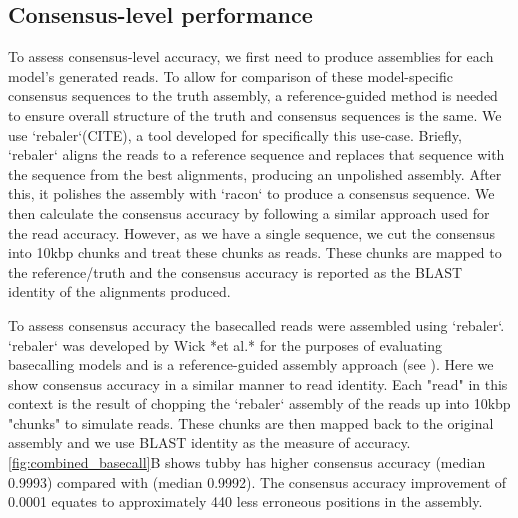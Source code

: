\subsection{Consensus-level performance}
\label{sec:tubby-error-types}

To assess consensus-level accuracy, we first need to produce assemblies for each model's generated reads. To allow for comparison of these model-specific consensus sequences to the truth assembly, a reference-guided method is needed to ensure overall structure of the truth and consensus sequences is the same. We use `rebaler`(CITE), a tool developed for specifically this use-case. Briefly, `rebaler` aligns the reads to a reference sequence and replaces that sequence with the sequence from the best alignments, producing an unpolished assembly. After this, it polishes the assembly with `racon` to produce a consensus sequence. We then calculate the consensus accuracy by following a similar approach used for the read accuracy. However, as we have a single sequence, we cut the consensus into 10kbp chunks and treat these chunks as reads. These chunks are mapped to the reference/truth and the consensus accuracy is reported as the BLAST identity of the alignments produced.  

To assess consensus accuracy the basecalled reads were assembled using `rebaler`. `rebaler` was developed by Wick *et al.* for the purposes of evaluating basecalling models and is a reference-guided assembly approach (see ). Here we show consensus accuracy in a similar manner to read identity. Each "read" in this context is the result of chopping the `rebaler` assembly of the reads up into 10kbp "chunks" to simulate reads. These chunks are then mapped back to the original assembly and we use BLAST identity as the measure of accuracy. \autoref{fig:combined_basecall}B shows tubby has higher consensus accuracy (median 0.9993) compared with \guppy{} (median 0.9992). The consensus accuracy improvement of 0.0001 equates to approximately 440 less erroneous positions in the \mtb{} assembly.
